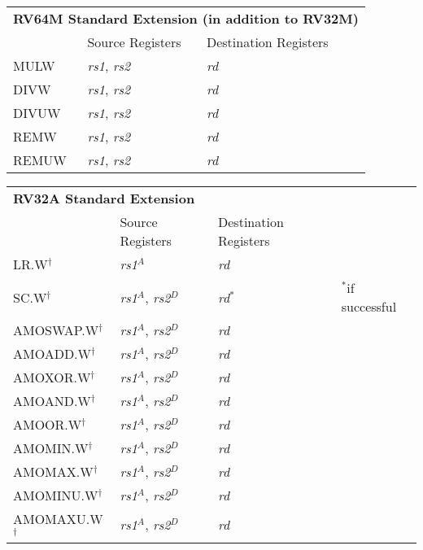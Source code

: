 \begin{tabular}{p{25mm}|p{3cm}|p{6cm}|p{10cm}}
  \multicolumn{4}{l}{\bf RV64M Standard Extension (in addition to RV32M)} \\
  \cline{2-3}
   & Source Registers & Destination Registers \\
  \cline{2-3}
   MULW & {\em rs1}, {\em rs2} & {\em rd} &  \\
   \cline{2-3}
   DIVW & {\em rs1}, {\em rs2} & {\em rd} &  \\
   \cline{2-3}
   DIVUW & {\em rs1}, {\em rs2} & {\em rd} &  \\
   \cline{2-3}
   REMW & {\em rs1}, {\em rs2} & {\em rd} &  \\
   \cline{2-3}
   REMUW & {\em rs1}, {\em rs2} & {\em rd} &  \\
   \cline{2-3}
\end{tabular}

\begin{tabular}{p{25mm}|p{3cm}|p{6cm}|p{10cm}}
  \multicolumn{4}{l}{\bf RV32A Standard Extension} \\
  \cline{2-3}
   & Source Registers & Destination Registers \\
  \cline{2-3}
   LR.W$^\dagger$ & {\em rs1}$^A$ & {\em rd} &  \\
   \cline{2-3}
   SC.W$^\dagger$ & {\em rs1}$^A$, {\em rs2}$^D$ & {\em rd}$^*$ & $^*$if successful \\
   \cline{2-3}
   AMOSWAP.W$^\dagger$ & {\em rs1}$^A$, {\em rs2}$^D$ & {\em rd} &  \\
   \cline{2-3}
   AMOADD.W$^\dagger$ & {\em rs1}$^A$, {\em rs2}$^D$ & {\em rd} &  \\
   \cline{2-3}
   AMOXOR.W$^\dagger$ & {\em rs1}$^A$, {\em rs2}$^D$ & {\em rd} &  \\
   \cline{2-3}
   AMOAND.W$^\dagger$ & {\em rs1}$^A$, {\em rs2}$^D$ & {\em rd} &  \\
   \cline{2-3}
   AMOOR.W$^\dagger$ & {\em rs1}$^A$, {\em rs2}$^D$ & {\em rd} &  \\
   \cline{2-3}
   AMOMIN.W$^\dagger$ & {\em rs1}$^A$, {\em rs2}$^D$ & {\em rd} &  \\
   \cline{2-3}
   AMOMAX.W$^\dagger$ & {\em rs1}$^A$, {\em rs2}$^D$ & {\em rd} &  \\
   \cline{2-3}
   AMOMINU.W$^\dagger$ & {\em rs1}$^A$, {\em rs2}$^D$ & {\em rd} &  \\
   \cline{2-3}
   AMOMAXU.W$^\dagger$ & {\em rs1}$^A$, {\em rs2}$^D$ & {\em rd} &  \\
   \cline{2-3}
\end{tabular}

